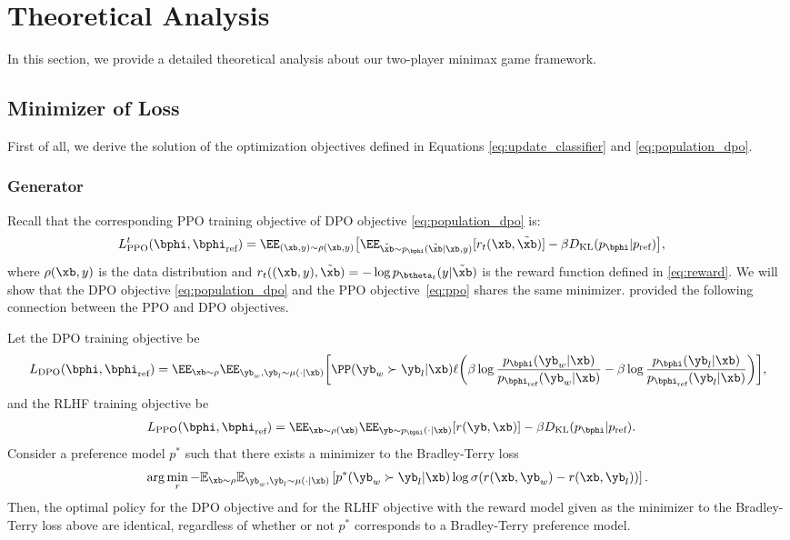 \section{Theoretical Analysis}\label{app:proof}
In this section, we provide a detailed theoretical analysis about our two-player minimax game framework.
\subsection{Minimizer of Loss}
First of all, we derive the solution of the optimization objectives defined in Equations \eqref{eq:update_classifier} and \eqref{eq:population_dpo}.
\subsubsection{Generator}
Recall that the corresponding PPO training objective of DPO objective \eqref{eq:population_dpo} is:
\begin{align}
    & L_{\text{PPO}}^t(\bphi,\bphi_{\text{ref}}) = \EE_{(\xb,y)\sim\rho(\xb,y)}  \big[ \EE_{\tilde{\xb}\sim p_{\bphi}(\tilde{\xb} | \xb, y)}[r_t(\xb, \tilde{\xb})] - \beta D_{\text{KL}}(p_{\bphi} | p_{\text{ref}}) \big],\label{eq:ppo}
\end{align}
where $\rho(\xb,y)$ is the data distribution and $r_t((\xb,y), \tilde{\xb}) = - \log p_{\btheta_t}(y|\tilde{\xb})$ is the reward function defined in \eqref{eq:reward}. We will show that the DPO objective \eqref{eq:population_dpo} and the PPO objective~\ref{eq:ppo} shares the same minimizer. \citet{azar2024general} provided the following connection between the PPO and DPO objectives.
\begin{proposition}\label{prop:same_minimizer}
Let the DPO training objective be 
\begin{align*}
    L_{\text{DPO}}(\bphi, \bphi_{\text{ref}}) = \EE_{\xb\sim\rho}\EE_{\yb_w, \yb_l \sim \mu(\cdot|\xb)} \bigg[ \PP(\yb_w \succ \yb_l | \xb) 
 \ell\bigg(\beta \log \frac{p_{\bphi}(\yb_w | \xb)}{p_{\bphi_{\text{ref}}}(\yb_w | \xb)} - \beta \log \frac{p_{\bphi}(\yb_l | \xb)}{p_{\bphi_{\text{ref}}}(\yb_l | \xb)}\bigg)\bigg],
\end{align*}
and the RLHF training objective be
\begin{align*}
    & L_{\text{PPO}}(\bphi,\bphi_{\text{ref}}) = \EE_{\xb\sim\rho(\xb)}{\EE_{\yb \sim p_{\bphi}(\cdot|\xb)}[r(\yb, \xb)]} - {\beta D_{\text{KL}}(p_{\bphi} | p_{\text{ref}})}.
\end{align*}
    Consider a preference model \( p^* \) such that there exists a minimizer to the Bradley-Terry loss
\[
\arg\min_r - \mathbb{E}_{\xb \sim \rho} \mathbb{E}_{\yb_w, \yb_l \sim \mu(\cdot | \xb)} \left[ p^*(\yb_w \succ \yb_l | \xb) \log \sigma(r(\xb, \yb_w) - r(\xb, \yb_l)) \right].
\]
Then, the optimal policy for the DPO objective and for the RLHF objective with the reward model given as the minimizer to the Bradley-Terry loss above are identical, regardless of whether or not \( p^* \) corresponds to a Bradley-Terry preference model.
\end{proposition}

